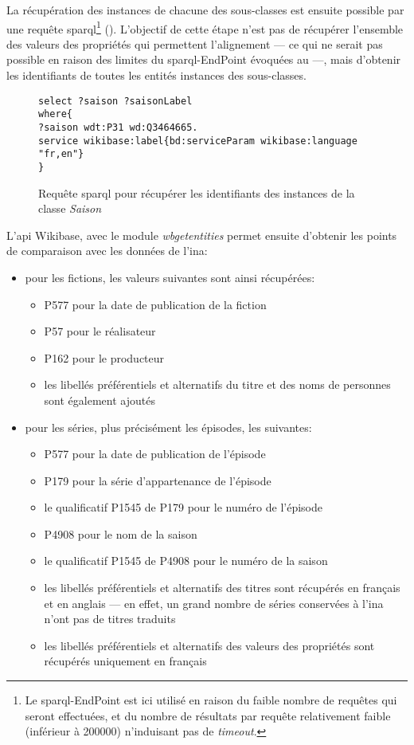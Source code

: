 La récupération des instances de chacune des sous-classes est ensuite possible par une requête \ac{sparql}\footnote{Le \ac{sparql}-EndPoint est ici utilisé en raison du faible nombre de requêtes qui seront effectuées, et du nombre de résultats par requête relativement faible (inférieur à 200000) n'induisant pas de \textit{timeout}.} (). L'objectif de cette étape n'est pas de récupérer l'ensemble des valeurs des propriétés qui permettent l'alignement --- ce qui ne serait pas possible en raison des limites du \ac{sparql}-EndPoint évoquées au  ---, mais d'obtenir les identifiants de toutes les entités instances des sous-classes.
\begin{figure}[!h]
	\centering
	\begin{verbatim}
select ?saison ?saisonLabel
where{
?saison wdt:P31 wd:Q3464665.
service wikibase:label{bd:serviceParam wikibase:language "fr,en"}
}
	\end{verbatim}
	\caption{Requête \ac{sparql} pour récupérer les identifiants des instances de la classe \textit{Saison}}
	\label{sparql_2}
\end{figure}

L'\ac{api} Wikibase, avec le module \textit{wbgetentities} permet ensuite d'obtenir les points de comparaison avec les données de l'\ac{ina}:
\begin{itemize}
	\item pour les fictions, les valeurs suivantes sont ainsi récupérées:
	\begin{itemize}
		\item P577 pour la date de publication de la fiction
		\item P57 pour le réalisateur
		\item P162 pour le producteur
		\item les libellés préférentiels et alternatifs du titre et des noms de personnes sont également ajoutés
	\end{itemize}
	\item pour les séries, plus précisément les épisodes, les suivantes:
	\begin{itemize}
		\item P577 pour la date de publication de l'épisode
		\item P179 pour la série d'appartenance de l'épisode
		\item le qualificatif P1545 de P179 pour le numéro de l'épisode
		\item P4908 pour le nom de la saison
		\item le qualificatif P1545 de P4908 pour le numéro de la saison
		\item les libellés préférentiels et alternatifs des titres sont récupérés en français et en anglais --- en effet, un grand nombre de séries conservées à l'\ac{ina} n'ont pas de titres traduits
		\item les libellés préférentiels et alternatifs des valeurs des propriétés sont récupérés uniquement en français
	\end{itemize}
\end{itemize}

